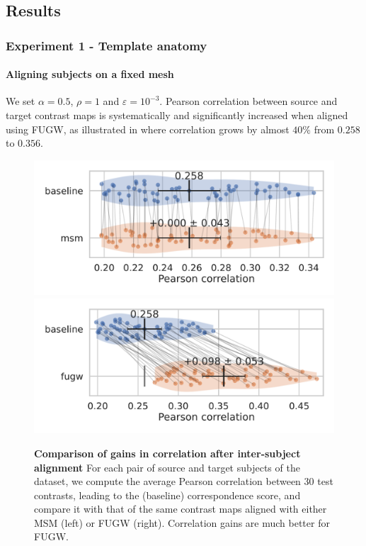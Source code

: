 \subsection{Results}

\subsubsection{Experiment 1 - Template anatomy}

\paragraph{Aligning subjects on a fixed mesh}

We set $\alpha = 0.5$, $\rho = 1$ and $\varepsilon = 10^{-3}$.
Pearson correlation between source and target contrast maps is systematically and
significantly increased when aligned using FUGW, as illustrated in
 where correlation grows by almost $40\%$
from $0.258$ to $0.356$.

\begin{figure}[ht!]
    \centering
    \includegraphics[width=0.49\columnwidth]{./Chapitre4/figures/fsaverage5_alignment_correlation_gain_msm.pdf}
    \includegraphics[width=0.49\columnwidth]{./Chapitre4/figures/fsaverage5_alignment_correlation_gain_fugw.pdf}
    \caption{
        \textbf{Comparison of gains in correlation after inter-subject alignment}
        For each pair of source and target subjects of the dataset,
        we compute the average Pearson correlation between 30 test contrasts,
        leading to the (baseline) correspondence score,
        and compare it with that of the same contrast maps
        aligned with either MSM (left) or FUGW (right). Correlation gains are much better for FUGW.
    }
    \label{fig:gain_comparisions_fsaverage5}
\end{figure}

